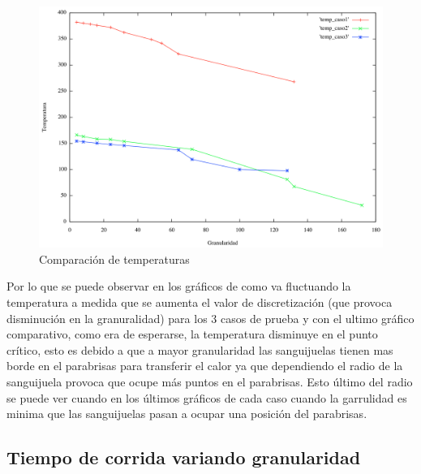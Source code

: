 \begin{figure}[htb]
\begin{center}
        \includegraphics[scale=0.5]{imagenes/comparacion_temperatura.png}
                \caption{Comparación de temperaturas}
        \end{center}

\end{figure}

Por lo que se puede observar en los gráficos de como va fluctuando la temperatura a medida que se aumenta el valor de discretización (que provoca disminución en la granuralidad) para los 3 casos de prueba y con el ultimo gráfico comparativo, como era de esperarse, la temperatura disminuye en el punto crítico, esto es debido a que a mayor granularidad las sanguijuelas tienen mas borde en el parabrisas para transferir el calor ya que dependiendo el radio de la sanguijuela provoca que ocupe más puntos en el parabrisas. Esto último del radio se puede ver cuando en los últimos gráficos de cada caso cuando la garrulidad es minima que las sanguijuelas pasan a ocupar una posición del parabrisas.

\newpage

\subsection{Tiempo de corrida variando granularidad}

